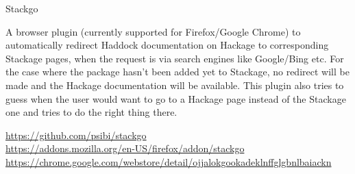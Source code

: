 \begin{hcarentry}{Stackgo}
\makeheader

A browser plugin (currently supported for Firefox/Google Chrome) to
automatically redirect Haddock documentation on Hackage to
corresponding Stackage pages, when the request is via search engines
like Google/Bing etc. For the case where the package hasn't been added
yet to Stackage, no redirect will be made and the Hackage
documentation will be available. This plugin also tries to guess when
the user would want to go to a Hackage page instead of the Stackage
one and tries to do the right thing there.

\FurtherReading
\url{https://github.com/psibi/stackgo} \\
\url{https://addons.mozilla.org/en-US/firefox/addon/stackgo} \\
\url{https://chrome.google.com/webstore/detail/ojjalokgookadeklnffglgbnlbaiackn}
\end{hcarentry}
